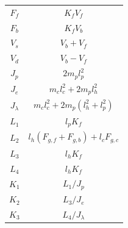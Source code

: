 \begin{tabular}{ c|c } 
    $F_f$ & $K_f V_f$ \\ 
    $F_b$ & $K_f V_b$ \\ 
    \hline
    $V_s$ & $V_b + V_f$ \\
    $V_d$ & $V_b - V_f$ \\ 
    \hline
    $J_p$ & $2 m_p l_p^2$ \\
    $J_e$ & $m_c l_c^2 + 2 m_p l_h^2$ \\
    $J_\lambda$ & $m_c l_c^2 + 2 m_p (l_h^2 + l_p^2)$ \\
    \hline
    $L_1$ & $l_p K_f$ \\
    $L_2$ & $l_h (F_{g,f} + F_{g,b}) + l_c F_{g,c}$ \\
    $L_3$ & $l_h K_f$ \\
    $L_4$ & $l_h K_f$ \\
    \hline
    $K_1$ & $L_1 / J_p$ \\
    $K_2$ & $L_3/J_e$ \\
    $K_3$ & $L_4/J_\lambda$ \\
\end{tabular}
